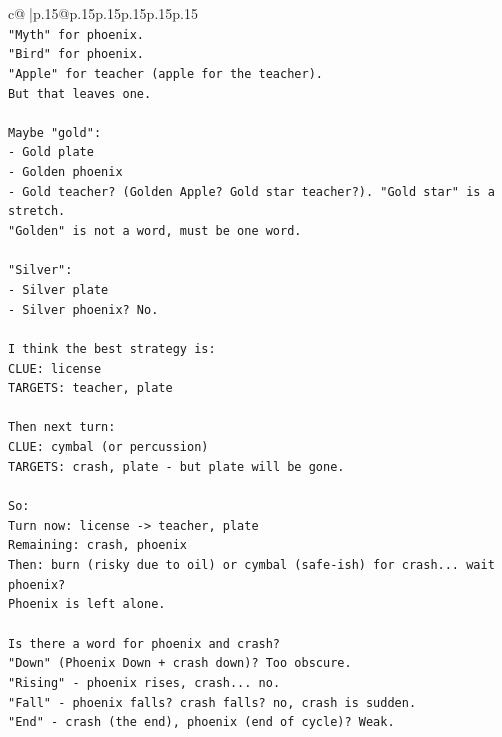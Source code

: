 \documentclass{article}
\begin{document}
{\begin{supertabular}{c@{$\;$}|p{.15\linewidth}@{}p{.15\linewidth}p{.15\linewidth}p{.15\linewidth}p{.15\linewidth}p{.15\linewidth}}
{{{\\ 
\texttt{"Myth" for phoenix.} \\
\texttt{"Bird" for phoenix.} \\
\texttt{"Apple" for teacher (apple for the teacher).} \\
\texttt{But that leaves one.} \\
\\ 
\texttt{Maybe "gold":} \\
\texttt{{-} Gold plate} \\
\texttt{{-} Golden phoenix} \\
\texttt{{-} Gold teacher? (Golden Apple? Gold star teacher?). "Gold star" is a stretch.} \\
\texttt{"Golden" is not a word, must be one word.} \\
\\ 
\texttt{"Silver":} \\
\texttt{{-} Silver plate} \\
\texttt{{-} Silver phoenix? No.} \\
\\ 
\texttt{I think the best strategy is:} \\
\texttt{CLUE: license} \\
\texttt{TARGETS: teacher, plate} \\
\\ 
\texttt{Then next turn:} \\
\texttt{CLUE: cymbal (or percussion)} \\
\texttt{TARGETS: crash, plate {-} but plate will be gone.} \\
\\ 
\texttt{So:} \\
\texttt{Turn now: license {-}> teacher, plate} \\
\texttt{Remaining: crash, phoenix} \\
\texttt{Then: burn (risky due to oil) or cymbal (safe{-}ish) for crash... wait phoenix?} \\
\texttt{Phoenix is left alone.} \\
\\ 
\texttt{Is there a word for phoenix and crash?} \\
\texttt{"Down" (Phoenix Down + crash down)? Too obscure.} \\
\texttt{"Rising" {-} phoenix rises, crash... no.} \\
\texttt{"Fall" {-} phoenix falls? crash falls? no, crash is sudden.} \\
\texttt{"End" {-} crash (the end), phoenix (end of cycle)? Weak.} \\
}}}
\end{supertabular}}
\end{document}
